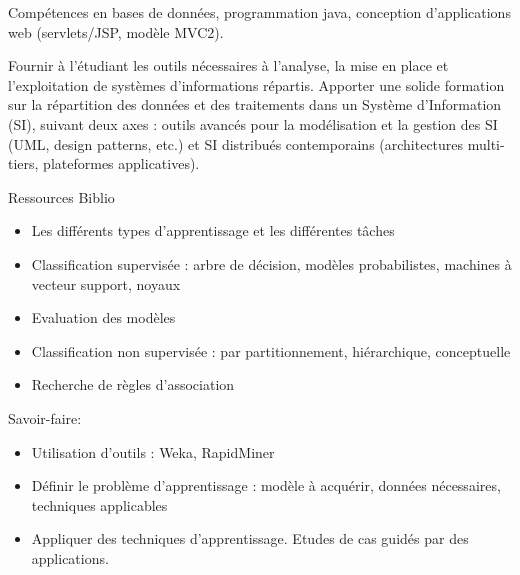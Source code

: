 {Compétences en bases de données, programmation java, conception
d'applications web (servlets/JSP, modèle MVC2).} 
{\begin{itemize} 
  \ObjItem Fournir à l'étudiant les outils nécessaires à l'analyse, la mise en place et
l'exploitation de systèmes d'informations répartis.
  \ObjItem Apporter une solide
formation sur la répartition des données et des traitements dans un
Système d'Information (SI), suivant deux axes : outils avancés pour la
modélisation et la gestion des SI (UML, design patterns, etc.) et SI
distribués contemporains (architectures multi-tiers, plateformes
applicatives).
\end{itemize} 
} 
{Ressources} 
{Biblio} 
 
\vfill

{
\begin{itemize} 
\item Les différents types d'apprentissage et les différentes tâches
\item Classification supervisée : arbre de décision, modèles probabilistes,
machines à vecteur support, noyaux
\item Evaluation des modèles
\item Classification non supervisée : par partitionnement, hiérarchique,
conceptuelle
\item Recherche de règles d'association
\end{itemize} 
Savoir-faire:
\begin{itemize} 
\item Utilisation d'outils : Weka, RapidMiner
\item Définir le problème d'apprentissage : modèle à acquérir, données
nécessaires, techniques applicables
\item Appliquer des techniques d'apprentissage.
Etudes de cas guidés par des applications.
\end{itemize} 
} 
